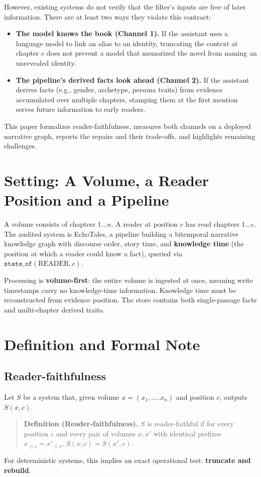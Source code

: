 \documentclass[11pt]{article}
\begin{document}
However, existing systems do not verify that the filter's inputs are free of later information. There are at least two ways they violate this contract:
\begin{itemize}
    \item \textbf{The model knows the book (Channel 1).} If the assistant uses a language model to link an alias to an identity, truncating the context at chapter $c$ does not prevent a model that memorized the novel from naming an unrevealed identity.
    \item \textbf{The pipeline's derived facts look ahead (Channel 2).} If the assistant derives facts (e.g., gender, archetype, persona traits) from evidence accumulated over multiple chapters, stamping them at the first mention serves future information to early readers.
\end{itemize}

This paper formalizes reader-faithfulness, measures both channels on a deployed narrative graph, reports the repairs and their trade-offs, and highlights remaining challenges.

\section{Setting: A Volume, a Reader Position and a Pipeline}

A volume consists of chapters $1 \dots n$. A reader at position $c$ has read chapters $1 \dots c$. The audited system is EchoTales, a pipeline building a bitemporal narrative knowledge graph with discourse order, story time, and \textbf{knowledge time} (the position at which a reader could know a fact), queried via $\texttt{state\_of}(\text{READER}, c)$.

Processing is \textbf{volume-first}: the entire volume is ingested at once, meaning write timestamps carry no knowledge-time information. Knowledge time must be reconstructed from evidence position. The store contains both single-passage facts and multi-chapter derived traits.

\section{Definition and Formal Note}

\subsection{Reader-faithfulness}

Let $S$ be a system that, given volume $x = (x_1, \dots, x_n)$ and position $c$, outputs $S(x, c)$.
\begin{quote}
\textbf{Definition (Reader-faithfulness).} $S$ is reader-faithful if for every position $c$ and every pair of volumes $x, x'$ with identical prefixes $x_{\le c} = x'_{\le c}$, $S(x, c) = S(x', c)$.
\end{quote}
For deterministic systems, this implies an exact operational test: \textbf{truncate and rebuild}.
\end{document}
